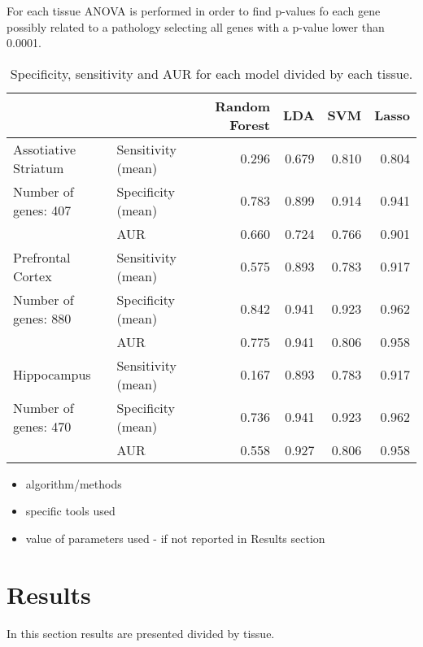 \documentclass[11pt, onecolumn, twoside]{article}
\begin{document}
For each tissue ANOVA is performed in order to find p-values fo each gene possibly related to a pathology selecting all genes with a p-value lower than 0.0001.

\begin{table*}
    \centering
    \caption{Specificity, sensitivity and AUR for each model divided by each tissue.}
    \label{tab:classifiers}
    \begin{tabular}{llrrrr}
        \toprule
                                     &                   & Random Forest &  LDA  &  SVM  & Lasso \\
        \midrule
        \small{Assotiative Striatum} & Sensitivity (mean)& 0.296         & 0.679 & 0.810 & 0.804 \\
        \small{Number of genes: 407} & Specificity (mean)& 0.783         & 0.899 & 0.914 & 0.941 \\
                                     & AUR               & 0.660         & 0.724 & 0.766 & 0.901 \\
        \midrule
        \small{Prefrontal Cortex}    & Sensitivity (mean)& 0.575         & 0.893 & 0.783 & 0.917 \\
        \small{Number of genes: 880} & Specificity (mean)& 0.842         & 0.941 & 0.923 & 0.962 \\
                                     & AUR               & 0.775         & 0.941 & 0.806 & 0.958 \\
        \midrule
        \small{Hippocampus}          & Sensitivity (mean)& 0.167         & 0.893 & 0.783 & 0.917 \\
        \small{Number of genes: 470} & Specificity (mean)& 0.736         & 0.941 & 0.923 & 0.962 \\
                                     & AUR               & 0.558         & 0.927 & 0.806 & 0.958 \\
        \bottomrule
    \end{tabular}
\end{table*}


\begin{itemize}
\item algorithm/methods
\item specific tools used
\item value of parameters used - if not reported in Results section
\end{itemize}

\section{Results}\label{results}
In this section results are presented divided by tissue.
\end{document}
